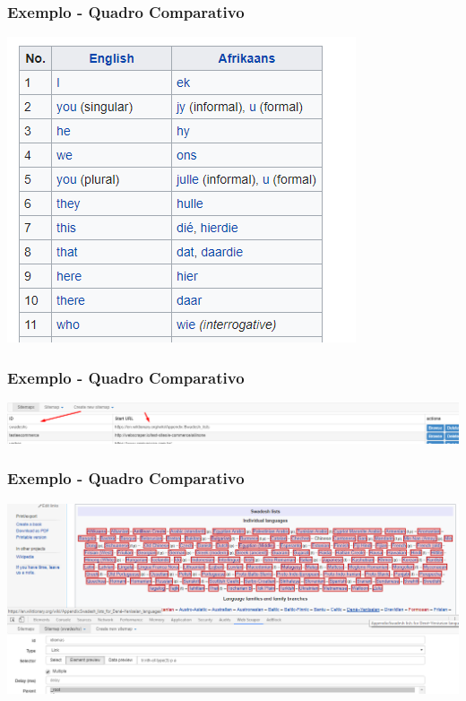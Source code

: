 \documentclass{beamer}
\begin{document}
\begin{frame}
\frametitle{Exemplo - Quadro Comparativo}
\includegraphics[width=\textwidth]{QuadroComparativo.png}
\end{frame}

\begin{frame}
\frametitle{Exemplo - Quadro Comparativo}
\includegraphics[width=\textwidth]{comparative1.png}
\end{frame}

\begin{frame}
\frametitle{Exemplo - Quadro Comparativo}
\includegraphics[width=\textwidth]{comparative2.png}
\end{frame}
\end{document}
